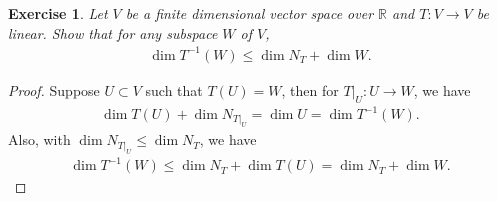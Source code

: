 \documentclass[11pt]{book}
\newtheorem{exercise}{Exercise}[section]
\theoremstyle{definition}
\numberwithin{equation}{chapter}
\begin{document}
\medskip

\begin{exercise}
Let $V$ be a finite dimensional vector space over $\mathbb{R}$ and $T: V \to V$ be linear. Show that for any subspace $W$ of $V$, 
\begin{align*}
    \dim T^{-1}(W) \leq \dim N_T + \dim W.
\end{align*}
\end{exercise}
\begin{proof}
Suppose $U \subset V$ such that $T(U) = W$, then for $T|_U:U \to W$, we have
\begin{align*}
    \dim T(U) + \dim N_{T|_U} = \dim U = \dim T^{-1}(W).
\end{align*}
Also, with $\dim N_{T|_U} \leq \dim N_T$, we have 
\begin{align*}
    \dim T^{-1}(W) \leq \dim N_T + \dim T(U) = \dim N_T + \dim W.
\end{align*}
\end{proof}

\medskip
\end{document}
